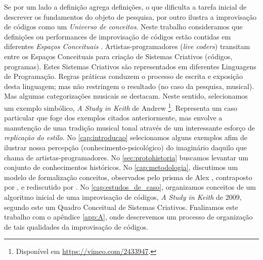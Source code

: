 Se por um lado a definição agrega definições, o que dificulta a tarefa inicial de descrever os fundamentos do objeto de pesquisa, por outro ilustra a improvisação de códigos como um \emph{Universo de conceitos}. Neste trabalho consideramos que definições ou performances de improvisação de códigos estão contidas em diferentes \emph{Espaços Conceituais} \cite{wiggins_framework_2006,mclean_music_2006}. Artistas-programadores (\emph{live coders}) transitam entre os Espaços Conceituais para criação de Sistemas Criativos (códigos, programas). Estes Sistemas Criativos são representados em diferentes Linguagens de Programação. Regras práticas conduzem o processo de escrita e exposição desta linguagem; mas não restringem o resultado (no caso da pesquisa, musical). Mas algumas categorizações musicais se destacam.  Neste sentido, selecionamos um exemplo simbólico, \emph{A Study in Keith} de Andrew \footnote{Disponível em \url{https://vimeo.com/2433947}.}. Representa um caso particular que foge dos exemplos citados anteriormente, mas envolve a manutenção de uma tradição musical tonal através de um interessante esforço de \emph{replicação do estilo}. No \autoref{cap:introducao} selecionamos alguns exemplos afim de ilustrar nossa percepção (conhecimento-psicológico) do imaginário daquilo que  chama de artistas-programadores. No \autoref{sec:protohistoria} buscamos levantar um conjunto de conhecimentos históricos. No \autoref{cap:metodologia}, discutimos um modelo de formalização conceitos, observados pelo prisma de Alex , contraposto por , e rediscutido por  . No \autoref{cap:estudos_de_caso}, organizamos conceitos de um algoritmo inicial de uma improvisação de códigos, \emph{A Study in Keith} de 2009, segundo este um Quadro Conceitual de Sistemas Criativos. Fnalizamos este trabalho com o apêndice \autoref{app:A}, onde descrevemos um processo de organização de tais qualidades da improvisação de códigos. 